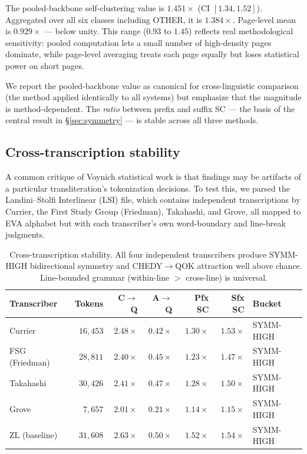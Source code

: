 \documentclass[11pt]{article}
\begin{document}
The pooled-backbone self-clustering value is $1.451\times$ (CI $[1.34, 1.52]$).
Aggregated over all six classes including OTHER, it is $1.384\times$.
Page-level mean is $0.929\times$ --- below unity. This range ($0.93$ to
$1.45$) reflects real methodological sensitivity: pooled computation lets a
small number of high-density pages dominate, while page-level averaging
treats each page equally but loses statistical power on short pages.

We report the pooled-backbone value as canonical for cross-linguistic
comparison (the method applied identically to all systems) but emphasize
that the magnitude is method-dependent. The \emph{ratio} between prefix and
suffix SC --- the basis of the central result in \S\ref{sec:symmetry} ---
is stable across all three methods.


\subsection{Cross-transcription stability}
\label{sec:crosstranscription}

A common critique of Voynich statistical work is that findings may be
artifacts of a particular transliteration's tokenization decisions. To
test this, we parsed the Landini--Stolfi Interlinear (LSI) file, which
contains independent transcriptions by Currier, the First Study Group
(Friedman), Takahashi, and Grove, all mapped to EVA alphabet but with
each transcriber's own word-boundary and line-break judgments.

\begin{table}[ht]
  \centering
  \caption{Cross-transcription stability. All four independent
  transcribers produce SYMM-HIGH bidirectional symmetry and
  CHEDY$\to$QOK attraction well above chance. Line-bounded grammar
  (within-line $>$ cross-line) is universal.}
  \label{tab:crosstranscription}
  \begin{tabular}{lrrrrrl}
    \toprule
    Transcriber & Tokens & C$\to$Q & A$\to$Q & Pfx SC & Sfx SC & Bucket \\
    \midrule
    Currier       & $16{,}453$ & $2.48\times$ & $0.42\times$ & $1.30\times$ & $1.53\times$ & SYMM-HIGH \\
    FSG (Friedman)& $28{,}811$ & $2.40\times$ & $0.45\times$ & $1.23\times$ & $1.47\times$ & SYMM-HIGH \\
    Takahashi     & $30{,}426$ & $2.41\times$ & $0.47\times$ & $1.28\times$ & $1.50\times$ & SYMM-HIGH \\
    Grove         & $7{,}657$  & $2.01\times$ & $0.21\times$ & $1.14\times$ & $1.15\times$ & SYMM-HIGH \\
    \midrule
    ZL (baseline) & $31{,}608$ & $2.63\times$ & $0.50\times$ & $1.52\times$ & $1.54\times$ & SYMM-HIGH \\
    \bottomrule
  \end{tabular}
\end{table}
\end{document}
